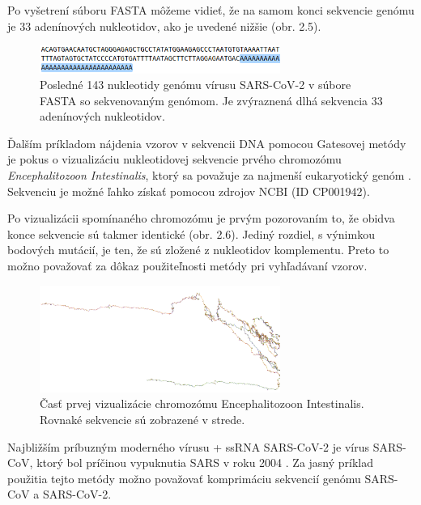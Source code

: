 Po vyšetrení súboru FASTA môžeme vidieť, že na samom konci sekvencie genómu je 33 adenínových nukleotidov, ako je uvedené nižšie (obr. 2.5).

\begin{figure}[!ht]
	\centering
	\includegraphics[width=0.7\textwidth]{figures/AAAA.png}
	\caption{Posledné 143 nukleotidy genómu vírusu SARS-CoV-2 v súbore FASTA so sekvenovaným genómom. Je zvýraznená dlhá sekvencia 33 adenínových nukleotidov.\label{o:latex_friendly_zone}}
\end{figure}

Ďalším príkladom nájdenia vzorov v sekvencii DNA pomocou Gatesovej metódy je pokus o vizualizáciu nukleotidovej sekvencie prvého chromozómu \textit{Encephalitozoon Intestinalis}, ktorý sa považuje za najmenší eukaryotický genóm \cite{smalleu}.
Sekvenciu je možné ľahko získať pomocou zdrojov NCBI (ID CP001942).

Po vizualizácii spomínaného chromozómu je prvým pozorovaním to, že obidva konce sekvencie sú takmer identické (obr. 2.6).
Jediný rozdiel, s výnimkou bodových mutácií, je ten, že sú zložené z nukleotidov komplementu.
Preto to možno považovať za dôkaz použiteľnosti metódy pri vyhľadávaní vzorov.

\begin{figure}[!ht]
	\centering
	\includegraphics[width=0.7\textwidth]{figures/gateseu.png}
	\caption{Časť prvej vizualizácie chromozómu Encephalitozoon Intestinalis. Rovnaké sekvencie sú zobrazené v strede.\label{o:latex_friendly_zone}}
\end{figure}

Najbližším príbuzným moderného vírusu + ssRNA SARS-CoV-2 je vírus SARS-CoV, ktorý bol príčinou vypuknutia SARS v roku 2004 \cite{cov1cov2}.
Za jasný príklad použitia tejto metódy možno považovať komprimáciu sekvencií genómu SARS-CoV a SARS-CoV-2.

